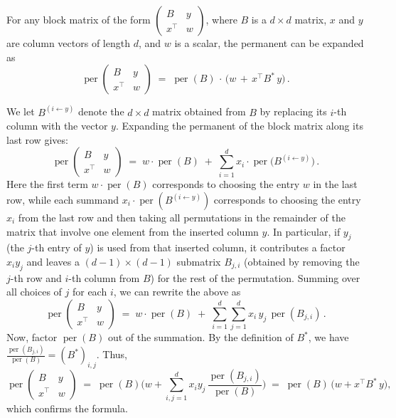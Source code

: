 \documentclass[11pt]{article}
\makeatletter
\theoremstyle{definition}
\newenvironment{proof}[1][\protect\proofname]{\par
	\normalfont\topsep6\p@\@plus6\p@\relax
	\trivlist
	\itemindent\parindent        %
	\item[\hskip\labelsep\scshape #1]\ignorespaces
}{%
	\endtrivlist\@endpefalse
}
\providecommand{\proofname}{Proof}
\DeclareMathOperator{\per}{per}
\makeatother
\begin{document}
\begin{observation}	\label{obs:rank-1-perm-update}
	For any block matrix of the form $\displaystyle\begin{pmatrix} B & y \\[3pt] x^\top & w \end{pmatrix}$, where $B$ is a $d\times d$ matrix, $x$ and $y$ are column vectors of length $d$, and $w$ is a scalar, the permanent can be expanded as
	\begin{equation*}
	    \per\begin{pmatrix} 
		B & y\\[3pt] 
		x^\top & w 
	\end{pmatrix}
	\;=\; \per(B)\,\cdot\,\Big(w \,+\, x^\top B^*\, y\Big)\,.
	\end{equation*}
\end{observation}
\begin{proof}
	We let $B^{(i \leftarrow y)}$ denote the $d\times d$ matrix obtained from $B$ by replacing its $i$-th column with the vector $y$. Expanding the permanent of the block matrix along its last row gives:
	\begin{equation*}
	    \per\begin{pmatrix} B & y \\ x^{\top} & w \end{pmatrix}
	\;=\; w \cdot \per(B) \;+\; \sum_{i=1}^d x_i \cdot \per\!\big( B^{(i\leftarrow y)} \big)\,. 
	\end{equation*}
	Here the first term $w\cdot\per(B)$ corresponds to choosing the entry $w$ in the last row, while each summand $x_i \cdot \per(B^{(i\leftarrow y)})$ corresponds to choosing the entry $x_i$ from the last row and then taking all permutations in the remainder of the matrix that involve one element from the inserted column $y$. In particular, if $y_j$ (the $j$-th entry of $y$) is used from that inserted column, it contributes a factor $x_i y_j$ and leaves a $(d-1)\times(d-1)$ submatrix $B_{j,i}$ (obtained by removing the $j$-th row and $i$-th column from $B$) for the rest of the permutation. Summing over all choices of $j$ for each $i$, we can rewrite the above as 
	\begin{equation*}
	    \per\begin{pmatrix} B & y \\ x^{\top} & w \end{pmatrix}
	\;=\; w \cdot \per(B) \;+\; \sum_{i=1}^d \sum_{j=1}^d x_i\,y_j\,\per(B_{j,i})\,.
	\end{equation*}
	Now, factor $\per(B)$ out of the summation. By the definition of $B^*$, we have $\frac{\per(B_{j,i})}{\per(B)} = (B^*)_{i,j}$. Thus,
	\begin{equation*}
	    \per\begin{pmatrix} B & y \\ x^{\top} & w \end{pmatrix}
	\;=\; \per(B)\Big( w + \sum_{i,j=1}^d x_i y_j\,\frac{\per(B_{j,i})}{\per(B)} \Big)
	\;=\; \per(B)\,\Big( w + x^\top B^*\,y \Big)\!,
	\end{equation*}
	which confirms the formula.
\end{proof}
\end{document}
